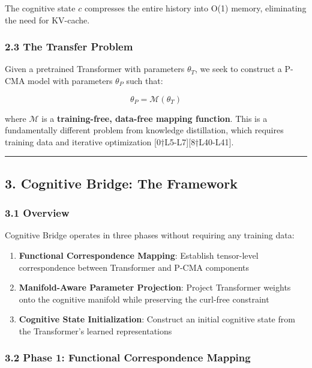 \documentclass[
  11pt,
  a4paper,
]{article}
\providecommand{\tightlist}{%
  \setlength{\itemsep}{0pt}\setlength{\parskip}{0pt}}
\begin{document}
The cognitive state \(c\) compresses the entire history into O(1)
memory, eliminating the need for KV-cache.

\subsubsection{2.3 The Transfer Problem}\label{the-transfer-problem}

Given a pretrained Transformer with parameters \(\theta_T\), we seek to
construct a P-CMA model with parameters \(\theta_P\) such that:

\[
\theta_P = \mathcal{M}(\theta_T)
\]

where \(\mathcal{M}\) is a \textbf{training-free, data-free mapping
function}. This is a fundamentally different problem from knowledge
distillation, which requires training data and iterative optimization
{[}0†L5-L7{]}{[}8†L40-L41{]}.

\begin{center}\rule{0.5\linewidth}{0.5pt}\end{center}

\subsection{3. Cognitive Bridge: The
Framework}\label{cognitive-bridge-the-framework}

\subsubsection{3.1 Overview}\label{overview}

Cognitive Bridge operates in three phases without requiring any training
data:

\begin{enumerate}
\def\labelenumi{\arabic{enumi}.}
\tightlist
\item
  \textbf{Functional Correspondence Mapping}: Establish tensor-level
  correspondence between Transformer and P-CMA components
\item
  \textbf{Manifold-Aware Parameter Projection}: Project Transformer
  weights onto the cognitive manifold while preserving the curl-free
  constraint
\item
  \textbf{Cognitive State Initialization}: Construct an initial
  cognitive state from the Transformer's learned representations
\end{enumerate}

\subsubsection{3.2 Phase 1: Functional Correspondence
Mapping}\label{phase-1-functional-correspondence-mapping}
\end{document}
